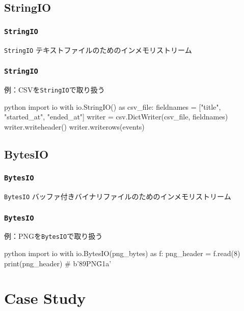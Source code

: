 \documentclass[dvipdfmx,12pt,notheorems]{beamer}
\theoremstyle{definition}
\begin{document}
\subsection{StringIO}

\begin{frame}\frametitle{\texttt{StringIO}}
\begin{block}{\texttt{StringIO}}
テキストファイルのためのインメモリストリーム
\end{block}
\end{frame}

\begin{frame}[fragile]\frametitle{\texttt{StringIO}}

\begin{exampleblock}{例：CSVを\texttt{StringIO}で取り扱う}
\begin{pygments}{python}
import io
with io.StringIO() as csv_file:
    fieldnames = ["title", "started_at", "ended_at"]
    writer = csv.DictWriter(csv_file, fieldnames)
    writer.writeheader()
    writer.writerows(events)
\end{pygments}
\end{exampleblock}

\end{frame}

\subsection{BytesIO}

\begin{frame}\frametitle{\texttt{BytesIO}}
\begin{block}{\texttt{BytesIO}}
バッファ付きバイナリファイルのためのインメモリストリーム
\end{block}
\end{frame}

\begin{frame}[fragile]\frametitle{\texttt{BytesIO}}

\begin{exampleblock}{例：PNGを\texttt{BytesIO}で取り扱う}
\begin{pygments}{python}
import io
with io.BytesIO(png_bytes) as f:
    png_header = f.read(8)
    print(png_header)  # b'\x89PNG\r\n\x1a\n'
\end{pygments}
\end{exampleblock}

\end{frame}

\section{Case Study}
\end{document}
